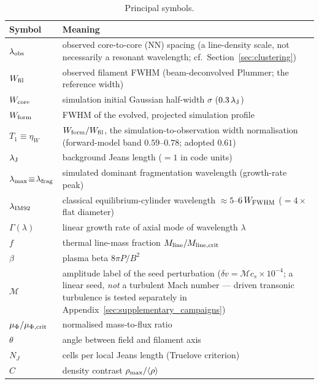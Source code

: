 \documentclass[usenatbib,twoside,twocolumn]{mnras}
\begin{document}
\begin{table}
\caption{Principal symbols.}
\label{tab:symbols}
\footnotesize
\setlength{\tabcolsep}{4pt}
\begin{tabular}{lp{6.1cm}}
\toprule
Symbol & Meaning \\
\midrule
$\lambda_{\rm obs}$ & observed core-to-core (NN) spacing (a line-density scale, not necessarily a resonant wavelength; cf.\ Section~\ref{sec:clustering}) \\
$W_{\rm fil}$ & observed filament FWHM (beam-deconvolved Plummer; the reference width) \\
$W_{\rm core}$ & simulation initial Gaussian half-width $\sigma$ ($0.3\,\lambda_{\rm J}$) \\
$W_{\rm form}$ & FWHM of the evolved, projected simulation profile \\
$T_1\!\equiv\!\eta_W$ & $W_{\rm form}/W_{\rm fil}$, the simulation-to-observation width normalisation (forward-model band $0.59$--$0.78$; adopted $0.61$) \\
$\lambda_{\rm J}$ & background Jeans length ($=1$ in code units) \\
$\lambda_{\rm max}\!\equiv\!\lambda_{\rm frag}$ & simulated dominant fragmentation wavelength (growth-rate peak) \\
$\lambda_{\rm IM92}$ & classical equilibrium-cylinder wavelength $\approx5$--$6\,W_{\rm FWHM}$ ($=4\times$ flat diameter) \\
$\Gamma(\lambda)$ & linear growth rate of axial mode of wavelength $\lambda$ \\
$f$ & thermal line-mass fraction $M_{\rm line}/M_{\rm line,crit}$ \\
$\beta$ & plasma beta $8\pi P/B^2$ \\
$\mathcal{M}$ & amplitude label of the seed perturbation ($\delta v=\mathcal{M}c_s\times10^{-4}$; a linear seed, \emph{not} a turbulent Mach number --- driven transonic turbulence is tested separately in Appendix~\ref{sec:supplementary_campaigns}) \\
$\mu_\Phi/\mu_{\Phi,\rm crit}$ & normalised mass-to-flux ratio \\
$\theta$ & angle between field and filament axis \\
$N_J$ & cells per local Jeans length (Truelove criterion) \\
$C$ & density contrast $\rho_{\rm max}/\langle\rho\rangle$ \\
\bottomrule
\end{tabular}
\end{table}
\end{document}
